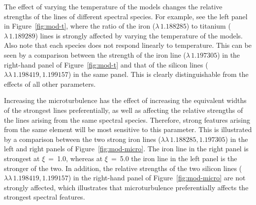 The effect of varying the temperature of the models changes the relative strengths of the lines of different spectral species.
For example, see the left panel in Figure~\ref{fig:mod-t}, where the ratio of the iron
($\lambda\,1.188285$) to titanium ($\lambda\,1.189289$) lines is strongly affected by varying the temperature of the models.
Also note that each species does not respond linearly to temperature.
This can be seen by a comparison between the strength of the iron line
($\lambda\,1.197305$) in the right-hand panel of Figure~\ref{fig:mod-t} and that of the silicon lines
($\lambda\lambda\,1.198419, 1.199157$) in the same panel.
This is clearly distinguishable from the effects of all other parameters.


Increasing the microturbulence has the effect of increasing the equivalent widths
of the strongest lines preferentially, as well as affecting the relative strengths of the lines arising from the same spectral species.
Therefore, strong features arising from the same element will be most sensitive to this
parameter.
This is illustrated by a comparison between the two strong iron lines
($\lambda\lambda\,1.188285, 1.197305$) in the left and
right panels of Figure~\ref{fig:mod-micro}.
The iron line in the right panel is strongest at $\xi$~=~1.0,
whereas at $\xi$~=~5.0 the iron line in the left panel is the stronger of the two.
In addition, the relative strengths of the two silicon lines
($\lambda\lambda\,1.198419, 1.199157$) in the right-hand panel of Figure~\ref{fig:mod-micro} are not strongly affected, which illustrates that microturbulence preferentially affects the strongest spectral features.

